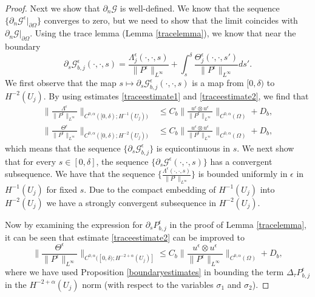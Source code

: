 \documentclass[12pt,a4paper]{article}
\theoremstyle{definition}
\theoremstyle{remark}
\numberwithin{equation}{section}
\begin{document}
\begin{proof}
Next we show that $\partial_n \mathcal{G}$ is well-defined. We know that the sequence $\{ \partial_n \mathcal{G}^\epsilon \lvert_{\partial \Omega} \}$ converges to zero, but we need to show that the limit coincides with $\partial_n \mathcal{G} \lvert_{\partial \Omega}$. Using the trace lemma (Lemma \ref{tracelemma}), we know that near the boundary
\begin{equation} \label{mollifiedtrace}
\partial_{s} \mathcal{G}^\epsilon_{b,j} (\cdot, \cdot, s) = \frac{\Lambda^\epsilon_j ( \cdot, \cdot, s)}{\lVert P^\epsilon \rVert_{L^\infty}} + \int_{s}^\delta \frac{\Theta^\epsilon_j (\cdot, \cdot, s')}{\lVert P^\epsilon \rVert_{L^\infty}} d s'.
\end{equation}
We first observe that the map $s \mapsto \partial_{s} \mathcal{G}^\epsilon_{b,j} (\cdot, \cdot, s)$ is a map from $[0,\delta)$ to $H^{-2} (U_j)$. By using estimates \eqref{traceestimate1} and \eqref{traceestimate2}, we find that
\begin{align*}
\bigg\lVert \frac{\Lambda^\epsilon}{\lVert P^\epsilon \rVert_{L^\infty}} \bigg\rVert_{C^{0,\alpha} ([0, \delta); H^{-1} (U_j))} &\leq C_b \bigg\lVert \frac{u^\epsilon \otimes u^\epsilon }{\lVert P^\epsilon \rVert_{L^\infty}} \bigg\rVert_{C^{0,\alpha} (\Omega)} + D_b, \\
\bigg\lVert \frac{\Theta^\epsilon}{\lVert P^\epsilon \rVert_{L^\infty}} \bigg\rVert_{C^{0,\alpha} ([0, \delta); H^{-2} (U_j))} &\leq C_b \bigg\lVert \frac{u^\epsilon \otimes u^\epsilon }{\lVert P^\epsilon \rVert_{L^\infty}} \bigg\rVert_{C^{0,\alpha} (\Omega)} + D_b,
\end{align*}
which means that the sequence $\{ \partial_s \mathcal{G}^\epsilon_{b,j} \}$ is equicontinuous in $s$. We next show that for every $s \in [0,\delta]$, the sequence $\{ \partial_s \mathcal{G}^\epsilon (\cdot, \cdot, s) \}$ has a convergent subsequence. We have that the sequence $\bigg\{ \frac{\Lambda^\epsilon (\cdot, \cdot, s)}{\lVert P^\epsilon \rVert_{L^\infty}} \bigg\}$ is bounded uniformly in $\epsilon$ in $H^{-1} (U_j)$ for fixed $s$. Due to the compact embedding of $H^{-1} (U_j)$ into $H^{-2} (U_j)$ we have a strongly convergent subsequence in $H^{-2} (U_j)$. 

Now by examining the expression for $\partial_s P^\epsilon_{b,j}$ in the proof of Lemma \ref{tracelemma}, it can be seen that estimate \eqref{traceestimate2} can be improved to 
\begin{equation*}
\bigg\lVert \frac{\Theta^\epsilon}{\lVert P^\epsilon \rVert_{L^\infty}} \bigg\rVert_{C^{0,\alpha} ([0, \delta); H^{-2+\alpha} (U_j)]} \leq C_b \bigg\lVert \frac{u^\epsilon \otimes u^\epsilon }{\lVert P^\epsilon \rVert_{L^\infty}} \bigg\rVert_{C^{0,\alpha} (\Omega)} + D_b,
\end{equation*}
where we have used Proposition \ref{boundaryestimates} in bounding the term $\Delta_\tau P^\epsilon_{b,j}$ in the $H^{-2+\alpha} (U_j)$ norm (with respect to the variables $\sigma_1$ and $\sigma_2$).


\end{proof}
\end{document}
